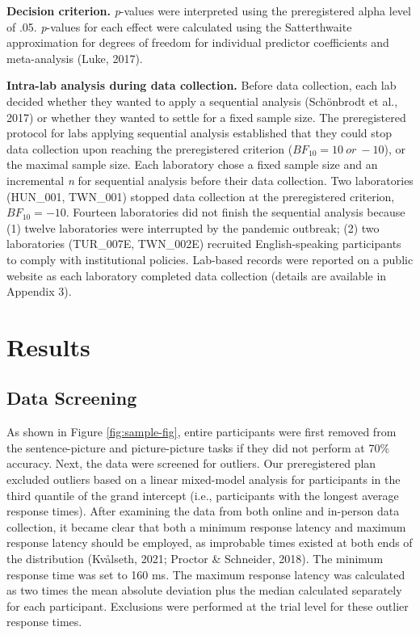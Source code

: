 \documentclass[
  man]{apa7}
\begin{document}
\textbf{Decision criterion.} \emph{p}-values were interpreted using the preregistered alpha level of .05. \emph{p}-values for each effect were calculated using the Satterthwaite approximation for degrees of freedom for individual predictor coefficients and meta-analysis (Luke, 2017).

\textbf{Intra-lab analysis during data collection.} Before data collection, each lab decided whether they wanted to apply a sequential analysis (Schönbrodt et al., 2017) or whether they wanted to settle for a fixed sample size. The preregistered protocol for labs applying sequential analysis established that they could stop data collection upon reaching the preregistered criterion (\(BF_{10} = 10\ or\ -10\)), or the maximal sample size. Each laboratory chose a fixed sample size and an incremental \emph{n} for sequential analysis before their data collection. Two laboratories (HUN\_001, TWN\_001) stopped data collection at the preregistered criterion, \(BF_{10} = -10\). Fourteen laboratories did not finish the sequential analysis because (1) twelve laboratories were interrupted by the pandemic outbreak; (2) two laboratories (TUR\_007E, TWN\_002E) recruited English-speaking participants to comply with institutional policies. Lab-based records were reported on a public website as each laboratory completed data collection (details are available in Appendix 3).

\hypertarget{results}{%
\section{Results}\label{results}}

\hypertarget{data-screening}{%
\subsection{Data Screening}\label{data-screening}}

As shown in Figure \ref{fig:sample-fig}, entire participants were first removed from the sentence-picture and picture-picture tasks if they did not perform at 70\% accuracy. Next, the data were screened for outliers. Our preregistered plan excluded outliers based on a linear mixed-model analysis for participants in the third quantile of the grand intercept (i.e., participants with the longest average response times). After examining the data from both online and in-person data collection, it became clear that both a minimum response latency and maximum response latency should be employed, as improbable times existed at both ends of the distribution (Kvålseth, 2021; Proctor \& Schneider, 2018). The minimum response time was set to 160 ms. The maximum response latency was calculated as two times the mean absolute deviation plus the median calculated separately for each participant. Exclusions were performed at the trial level for these outlier response times.
\end{document}
